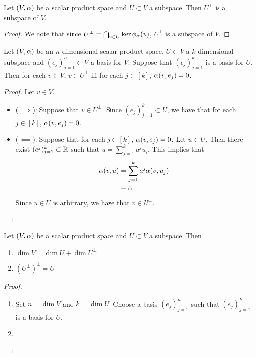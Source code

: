 \documentclass{book}
\begin{document}
	\begin{ex}
		Let $(V, \alpha)$ be a scalar product space and $U \subset V$ a subspace. Then
		$U^{\perp}$ is a subspace of $V$.
	\end{ex}

	\begin{proof}
		We note that since $U^{\perp} = \bigcap_{u \in U} \ker \phi_{\alpha}(u)$, $U^{\perp}$ is a subspace of $V$.
	\end{proof}

	\begin{ex}
		Let $(V, \alpha)$ be an $n$-dimensional scalar product space, $U \subset V$ a $k$-dimensional subspace and $(e_j)_{j=1}^n \subset V$ a basis for $V$. Suppose that $(e_j)_{j=1}^k$ is a basis for $U$. Then for each $v \in V$, $v \in U^{\perp}$ iff for each $j \in [k]$, $\alpha(v, e_j) = 0$. 
	\end{ex}

	\begin{proof} Let $v \in V$.
		\begin{itemize}
			\item ($\implies$): Suppose that $v \in U^{\perp}$. Since $(e_j)_{j=1}^k \subset U$, we have that for each $j \in [k]$, $\alpha(v, e_j) = 0$. 
			\item ($\impliedby$): Suppose that for each $j \in [k]$, $\alpha(v, e_j) = 0$. Let $u \in U$. Then there exist $(a^j)_{j=1}^k \subset \mathbb{R}$ such that $u = \sum\limits_{j=1}^k a^j u_j$. This implies that 
			\begin{align*}
				\alpha(v, u) 
				& = \sum_{j=1}^k a^j \alpha (v, u_j) \\
				& = 0
			\end{align*}
			Since $u \in U$ is arbitrary, we have that $v \in U^{\perp}$. 
		\end{itemize}
	\end{proof}

	\begin{ex}
		Let $(V, \alpha)$ be a scalar product space and $U \subset V$ a subspace. Then
		\begin{enumerate}
			\item $\dim V = \dim U + \dim U^{\perp}$
			\item $(U^{\perp})^{\perp} = U$
		\end{enumerate}
	\end{ex}

	\begin{proof}
		\begin{enumerate}
			\item Set $n = \dim V$ and $k = \dim U$. Choose a basis $(e_j)_{j=1}^n$ such that $(e_j)_{j=1}^k$ is a basis for $U$. 
			\item 
		\end{enumerate}
	\end{proof}	
	
\end{document}
